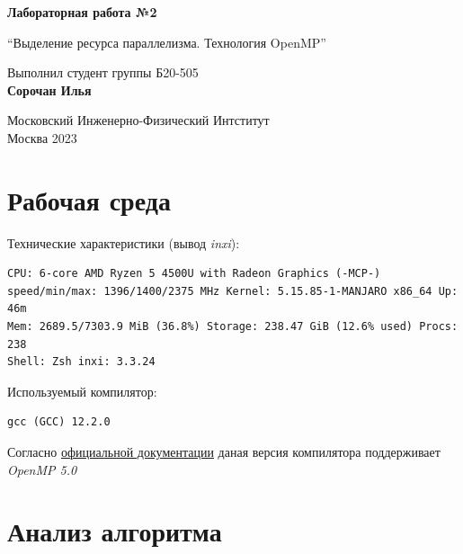 \documentclass[a4paper, 12pt]{article}
\begin{document}
\hypersetup{pageanchor=false}
\begin{titlepage}
 \begin{center}
  \vspace*{1cm}

  \Huge
  \textbf{Лабораторная работа №2}

  \vspace{0.5cm}
  \LARGE
  ``Выделение ресурса параллелизма. Технология OpenMP''

  \vspace{1.5cm}
  Выполнил студент группы Б20-505\\
  \textbf{Сорочан Илья}

  \vfill

  \Large
  Московский Инженерно-Физический Интститут\\
  Москва 2023

 \end{center}
\end{titlepage}



\section{Рабочая среда}

Технические характеристики (вывод \textit{inxi}):
\begin{verbatim}
CPU: 6-core AMD Ryzen 5 4500U with Radeon Graphics (-MCP-)
speed/min/max: 1396/1400/2375 MHz Kernel: 5.15.85-1-MANJARO x86_64 Up: 46m
Mem: 2689.5/7303.9 MiB (36.8%) Storage: 238.47 GiB (12.6% used) Procs: 238
Shell: Zsh inxi: 3.3.24
\end{verbatim}

Используемый компилятор:
\begin{verbatim}
gcc (GCC) 12.2.0
\end{verbatim}

Согласно \href{https://www.openmp.org/resources/openmp-compilers-tools/}{официальной документации} даная версия компилятора поддерживает \textit{OpenMP 5.0}


\section{Анализ алгоритма}
\end{document}
